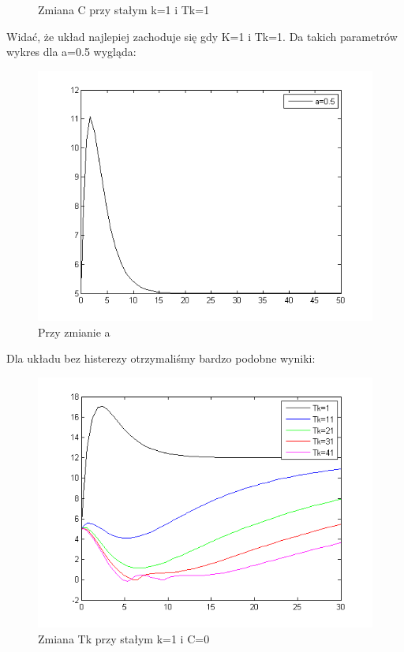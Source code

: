 \documentclass[a4paper,10pt]{article}
\begin{document}
\begin{enumerate}
\begin{figure}[!h]
	\caption{Zmiana C przy stałym k=1 i Tk=1}
    \label{fig:Rysunek}
\end{figure}
Widać, że układ najlepiej zachoduje się gdy K=1 i Tk=1.
Da takich parametrów wykres dla a=0.5 wygląda:
\begin{figure}[!h]
    \centering
	\includegraphics[width=120mm]{CW3-korekcja-dwupolozeniowy-e_a.png}
	\caption{Przy zmianie a}
    \label{fig:Rysunek}
\end{figure}


\newpage

Dla układu bez histerezy otrzymaliśmy bardzo podobne wyniki:
\begin{figure}[!h]
    \centering
	\includegraphics[width=120mm]{CW3-korekcja-dwupolozeniowyBH-e_Tk.png}
	\caption{Zmiana Tk przy stałym k=1 i C=0}
    \label{fig:Rysunek}
\end{figure}


\end{enumerate}
\end{document}
